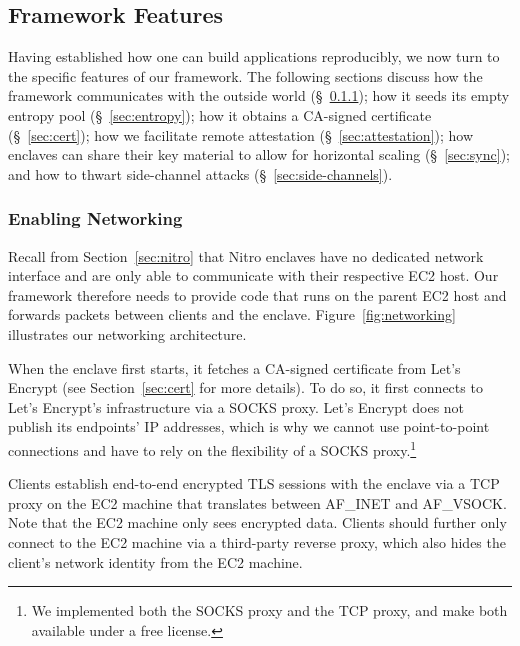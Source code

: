 \subsection{Framework Features}
\label{sec:framework}

Having established how one can build applications reproducibly, we now turn to
the specific features of our framework.  The following sections discuss how the
framework communicates with the outside world (\S~\ref{sec:networking});
how it seeds its empty entropy pool (\S~\ref{sec:entropy});
how it obtains a CA-signed certificate (\S~\ref{sec:cert});
how we facilitate remote attestation (\S~\ref{sec:attestation});
how enclaves can share their key material to allow for horizontal scaling (\S~\ref{sec:sync});
and how to thwart side-channel attacks (\S~\ref{sec:side-channels}).


\subsubsection{Enabling Networking}
\label{sec:networking}

Recall from Section~\ref{sec:nitro} that Nitro enclaves have no dedicated
network interface and are only able to communicate with their respective EC2
host.  Our framework therefore needs to provide code that runs on the parent
EC2 host and forwards packets between clients and the enclave.
Figure~\ref{fig:networking} illustrates our networking architecture.

When the enclave first starts, it fetches a CA-signed certificate from Let's
Encrypt (see Section~\ref{sec:cert} for more details).  To do so, it first
connects to Let's Encrypt's infrastructure via a SOCKS proxy.  Let's Encrypt
does not publish its endpoints' IP addresses, which is why we cannot use
point-to-point connections and have to rely on the flexibility of a SOCKS
proxy.\footnote{We implemented both the SOCKS proxy and the TCP proxy, and make
both available under a free license.}

Clients establish end-to-end encrypted TLS sessions with the enclave via a TCP
proxy on the EC2 machine that translates between AF\_INET and AF\_VSOCK.  Note
that the EC2 machine only sees encrypted data. Clients should further only
connect to the EC2 machine via a third-party reverse proxy, which also hides
the client's network identity from the EC2 machine.


